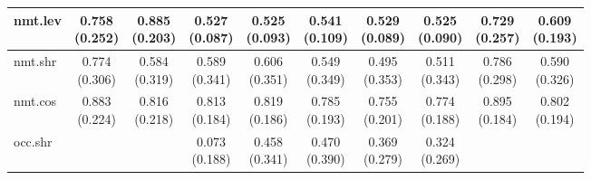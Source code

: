 \documentclass[epsfig,a4paper,11pt,titlepage,twoside,openany]{book}
\begin{document}
\begin{table}[h]
\begin{tabular}{l|c|c|c|c|c|c|c|c|c|}
\multicolumn{1}{|l|}{nmt.lev}            & \makecell{0.758 \\ (0.252)}  & \makecell{0.885 \\ (0.203)} & \makecell{0.527 \\ (0.087)} & \makecell{0.525 \\ (0.093)} & \makecell{0.541 \\ (0.109)} & \makecell{0.529 \\ (0.089)} & \makecell{0.525 \\ (0.090)} & \makecell{0.729 \\ (0.257)}    & \makecell{0.609 \\ (0.193)}   \\ \hline
\multicolumn{1}{|l|}{nmt.shr}                 & \makecell{0.774 \\ (0.306)}  & \makecell{0.584 \\ (0.319)} & \makecell{0.589 \\ (0.341)} & \makecell{0.606 \\ (0.351)} & \makecell{0.549 \\ (0.349)} & \makecell{0.495 \\ (0.353)} & \makecell{0.511 \\ (0.343)} & \makecell{0.786 \\ (0.298)}    & \makecell{0.590 \\ (0.326)}   \\ \hline
\multicolumn{1}{|l|}{nmt.cos} & \makecell{0.883 \\ (0.224)}  & \makecell{0.816 \\ (0.218)} & \makecell{0.813 \\ (0.184)} & \makecell{0.819 \\ (0.186)} & \makecell{0.785 \\ (0.193)} & \makecell{0.755 \\ (0.201)} & \makecell{0.774 \\ (0.188)} & \makecell{0.895 \\ (0.184)}    & \makecell{0.802 \\ (0.194)}   \\ \hline
\multicolumn{1}{|l|}{occ.shr}                  &               &              & \makecell{0.073 \\ (0.188)} & \makecell{0.458 \\ (0.341)} & \makecell{0.470 \\ (0.390)} & \makecell{0.369 \\ (0.279)} & \makecell{0.324 \\ (0.269)} &                 &                \\ \hline

\end{tabular}
\end{table}
\end{document}
